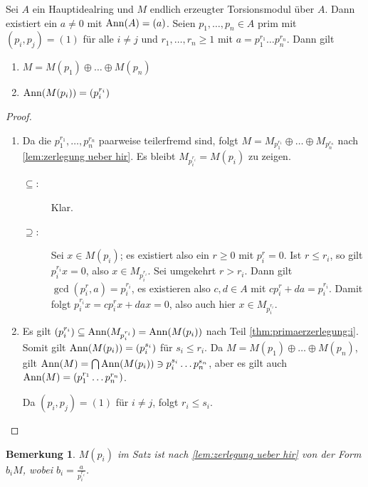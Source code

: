 \documentclass[12pt,a4paper]{scrartcl}
\theoremstyle{cplain}
\theoremstyle{cdef}
\newtheorem{beme}[thmcounter]{Bemerkung}
\begin{document}
\begin{satz} \label{thm:primaerzerlegung}
	Sei $A$ ein Hauptidealring und $M$ endlich erzeugter Torsionsmodul über $A$. Dann existiert ein $a\neq 0$ mit $\operatorname{Ann}(A) = (a)$. Seien $p_1,\dots, p_n\in A$ prim mit $(p_i, p_j) = (1)$ für alle $i\neq j$ und $r_1,\dots, r_n\ge 1$ mit $ a = p_1^{r_1}\dots p_n^{r_n} $. Dann gilt
	\begin{enumerate}
		\item $M = M(p_1)\oplus\dots\oplus M(p_n)$ \label{thm:primaerzerlegung:i}
		\item $\operatorname{Ann}(M(p_i)) = (p_i^{r_i})$ \label{thm:primaerzerlegung:ii}
	\end{enumerate}
\end{satz}
\begin{proof}
	\leavevmode
	\begin{enumerate}[label=\ref{thm:primaerzerlegung:\roman*}]
		\item Da die $p_1^{r_1},\dots, p_n^{r_n}$ paarweise teilerfremd sind, folgt $M = M_{p_1^{r_1}}\oplus\dots \oplus M_{p_n^{r_n}}$ nach \cref{lem:zerlegung ueber hir}. Es bleibt $M_{p_i^{r_i}} = M(p_i)$ zu zeigen.
		\begin{description}
			\item[\glqq$\subseteq$\grqq :] Klar.
			\item[\glqq$\supseteq$\grqq :] Sei $x\in M(p_i)$; es existiert also ein $r\ge 0$ mit $p_i^r = 0$. Ist $r \le r_i$, so gilt $p_i^{r_i}x = 0$, also $x \in M_{p_i^{r_i}}$. Sei umgekehrt $r>r_i$. Dann gilt $\gcd(p_i^r, a) = p_i^{r_i}$, es existieren also $c, d\in A$ mit $cp_i^r+da = p_i^{r_i}$. Damit folgt $p_i^{r_i}x = cp_i^rx+dax = 0$, also auch hier $x \in M_{p_i^{r_i}}$.
		\end{description}
		\item Es gilt $(p_i^{r_i})\subseteq \operatorname{Ann}(M_{p_i^{r_i}}) = \operatorname{Ann}(M(p_i))$ nach Teil \ref{thm:primaerzerlegung:i}. Somit gilt $\operatorname{Ann}(M(p_i)) = (p_i^{s_i})$ für $s_i\le r_i$. Da $M = M(p_1)\oplus \dots \oplus M(p_n)$, gilt $\operatorname{Ann}(M) = \bigcap \operatorname{Ann}(M(p_i))\ni p_i^{s_i}\dots p_n^{s_n}$, aber es gilt auch $\operatorname{Ann}(M) = (p_1^{r_1}\dots p_n^{r_n})$.
		
		Da $(p_i, p_j) = (1)$ für $i\neq j$, folgt $r_i\le s_i$.
		\qedhere
	\end{enumerate}
\end{proof}

\begin{beme}
	$M(p_i)$ im Satz ist nach \cref{lem:zerlegung ueber hir} von der Form $b_iM$, wobei $b_i = \frac{a}{p_i^{r_i}}$.
\end{beme}
\end{document}
